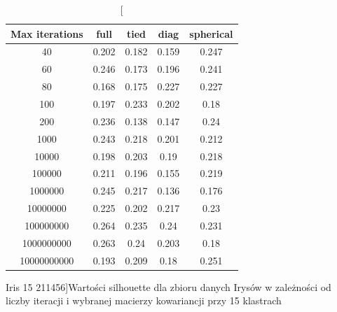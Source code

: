 \documentclass{classrep}
\begin{document}
{{            \begin{table}[!htbp]
                \begin{minipage}{1\textwidth}
                \centering
                \begin{tabular}{|c|c|c|c|c|}
                \hline
                Max iterations & full & tied & diag & spherical \\ \hline
                40 & 0.202 & 0.182 & 0.159 & 0.247 \\ \hline
                60 & 0.246 & 0.173 & 0.196 & 0.241 \\ \hline
                80 & 0.168 & 0.175 & 0.227 & 0.227 \\ \hline
                100 & 0.197 & 0.233 & 0.202 & 0.18 \\ \hline
                200 & 0.236 & 0.138 & 0.147 & 0.24 \\ \hline
                1000 & 0.243 & 0.218 & 0.201 & 0.212 \\ \hline
                10000 & 0.198 & 0.203 & 0.19 & 0.218 \\ \hline
                100000 & 0.211 & 0.196 & 0.155 & 0.219 \\ \hline
                1000000 & 0.245 & 0.217 & 0.136 & 0.176 \\ \hline
                10000000 & 0.225 & 0.202 & 0.217 & 0.23 \\ \hline
                100000000 & 0.264 & 0.235 & 0.24 & 0.231 \\ \hline
                1000000000 & 0.263 & 0.24 & 0.203 & 0.18 \\ \hline
                10000000000 & 0.193 & 0.209 & 0.18 & 0.251 \\ \hline
                \end{tabular}
                \caption
                [Iris 15 211456]{Wartości silhouette dla zbioru danych Irysów w zależności od liczby iteracji i wybranej macierzy kowariancji przy 15 klastrach}
                \label{Iris_15_211456}
                \end{minipage}
                \hfill            
            

\end{table}}}
\end{document}
